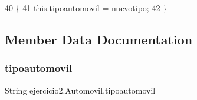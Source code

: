 \begin{DoxyCode}
40                                                   \{
41         this.\mbox{\hyperlink{classejercicio2_1_1_automovil_a64abc2717187d18de8f7ef8a86c4b025}{tipoautomovil}} = nuevotipo;
42     \}
\end{DoxyCode}


\subsection{Member Data Documentation}
\mbox{\label{classejercicio2_1_1_automovil_a64abc2717187d18de8f7ef8a86c4b025}} 
\subsubsection{\texorpdfstring{tipoautomovil}{tipoautomovil}}
{\footnotesize\ttfamily String ejercicio2.\+Automovil.\+tipoautomovil\hspace{0.3cm}{\ttfamily [private]}}

